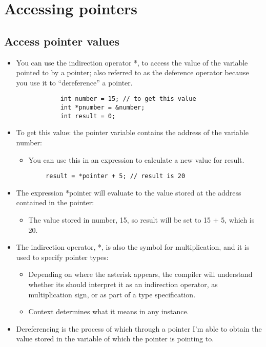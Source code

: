 \section{Accessing pointers}
\subsection{Access pointer values}
\begin{itemize}
    \item You can use the indirection operator *, to access the value of the variable pointed to by a pointer; also referred to as the deference operator because you use it to ``dereference'' a pointer.
        \begin{verbatim}
            int number = 15; // to get this value
            int *pnumber = &number;
            int result = 0; 
        \end{verbatim}
    
    \item To get this value: the pointer variable contains the address of the variable number:
        \begin{itemize}
            \item You can use this in an expression to calculate a new value for result.
        \end{itemize}
    \begin{verbatim}
        result = *pointer + 5; // result is 20 
    \end{verbatim}
    
    \item The expression *pointer will evaluate to the value stored at the address contained in the pointer:
        \begin{itemize}
            \item The value stored in number, 15, so result will be set to 15 + 5, which is 20.
        \end{itemize}
    
    \item The indirection operator, *, is also the symbol for multiplication, and it is used to specify pointer types:
        \begin{itemize}
            \item Depending on where the asterisk appears, the compiler will understand whether its should interpret it as an indirection operator, as multiplication sign, or as part of a type specification.
            \item Context determines what it means in any instance. 
        \end{itemize}
    
    \item Dereferencing is the process of which through a pointer I'm able to obtain the value stored in the variable of which the pointer is pointing to. 
\end{itemize}

